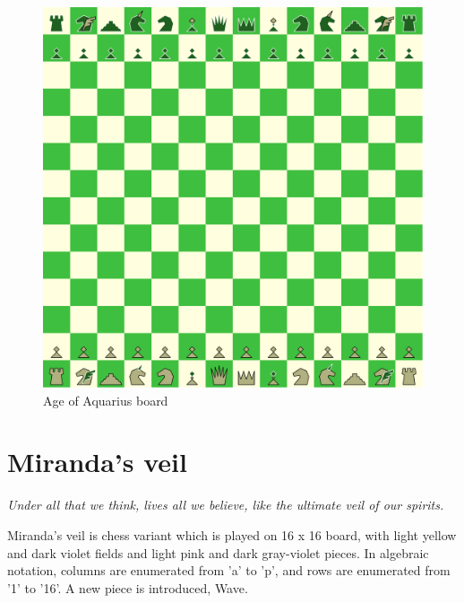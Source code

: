 \documentclass[a5paper,12pt,draft]{book} %
\begin{document}
\noindent
\begin{figure}[h]
\includegraphics[width=1.0\textwidth, keepaspectratio=true]{../gfx/boards/08_age_of_aquarius.png}
\caption{Age of Aquarius board}
\label{fig:age_of_aquarius}
\end{figure}

\clearpage

\chapter*{Miranda's veil}

\begin{flushright}
\parbox{0.8\textwidth}{
\emph{Under all that we think, lives all we believe, like the ultimate veil of our spirits. \\
 } }
\end{flushright}

\noindent
Miranda's veil is chess variant which is played on 16 x 16 board,
with light yellow and dark violet fields and light pink and dark
gray-violet pieces. In algebraic notation, columns are enumerated
from 'a' to 'p', and rows are enumerated from '1' to '16'. A new
piece is introduced, Wave.
\end{document}
